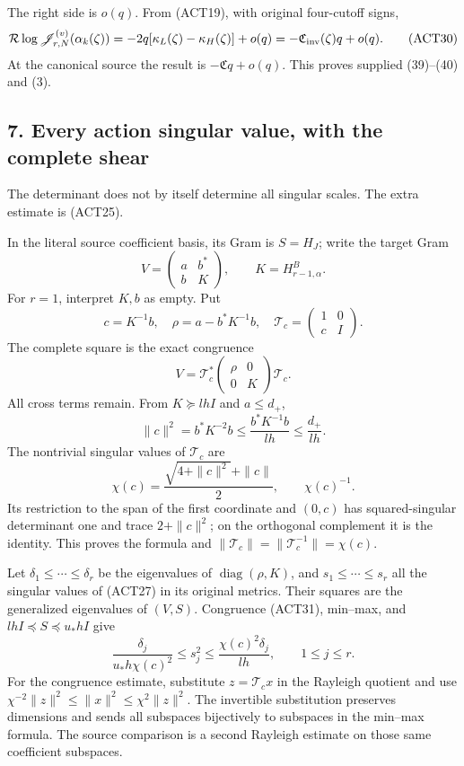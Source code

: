 \documentclass[11pt]{article}
\begin{document}
The right side is \(o(q)\). From (ACT19), with original four-cutoff signs, \[
\mathcal R\log\mathscr J_{r,N}^{(v)}(\alpha_k(\zeta))
=-2q[\kappa_L(\zeta)-\kappa_H(\zeta)]+o(q)
=-\mathfrak C_{\rm inv}(\zeta)q+o(q).
\tag{ACT30}
\] At the canonical source the result is \(-\mathfrak Cq+o(q)\). This proves supplied (39)--(40) and (3).

\subsection{7. Every action singular value, with the complete shear}\label{every-action-singular-value-with-the-complete-shear}

The determinant does not by itself determine all singular scales. The extra estimate is (ACT25).

In the literal source coefficient basis, its Gram is \(S=H_J\); write the target Gram \[
V=\begin{pmatrix}a&b^*\\b&K\end{pmatrix},\qquad K=H^B_{r-1,\alpha}.
\] For \(r=1\), interpret \(K,b\) as empty. Put \[
c=K^{-1}b,\quad \rho=a-b^*K^{-1}b,\quad
\mathcal T_c=\begin{pmatrix}1&0\\c&I\end{pmatrix}.
\] The complete square is the exact congruence \[
V=\mathcal T_c^*\begin{pmatrix}\rho&0\\0&K\end{pmatrix}\mathcal T_c.
\tag{ACT31}
\] All cross terms remain. From \(K\succeq lhI\) and \(a\le d_+\), \[
\|c\|^2=b^*K^{-2}b\le\frac{b^*K^{-1}b}{lh}\le\frac{d_+}{lh}.
\tag{ACT32}
\] The nontrivial singular values of \(\mathcal T_c\) are \[
\chi(c)=\frac{\sqrt{4+\|c\|^2}+\|c\|}{2},\qquad\chi(c)^{-1}.
\] Its restriction to the span of the first coordinate and \((0,c)\) has squared-singular determinant one and trace \(2+\|c\|^2\); on the orthogonal complement it is the identity. This proves the formula and \(\|\mathcal T_c\|=\|\mathcal T_c^{-1}\|=\chi(c)\).

Let \(\delta_1\le\cdots\le\delta_r\) be the eigenvalues of \(\operatorname{diag}(\rho,K)\), and \(s_1\le\cdots\le s_r\) all the singular values of (ACT27) in its original metrics. Their squares are the generalized eigenvalues of \((V,S)\). Congruence (ACT31), min--max, and \(lhI\preceq S\preceq u_*hI\) give \[
\boxed{\frac{\delta_j}{u_*h\chi(c)^2}\le s_j^2
\le\frac{\chi(c)^2\delta_j}{lh},\qquad1\le j\le r.}
\tag{ACT33}
\] For the congruence estimate, substitute \(z=\mathcal T_cx\) in the Rayleigh quotient and use \(\chi^{-2}\|z\|^2\le\|x\|^2\le\chi^2\|z\|^2\). The invertible substitution preserves dimensions and sends all subspaces bijectively to subspaces in the min--max formula. The source comparison is a second Rayleigh estimate on those same coefficient subspaces.
\end{document}
